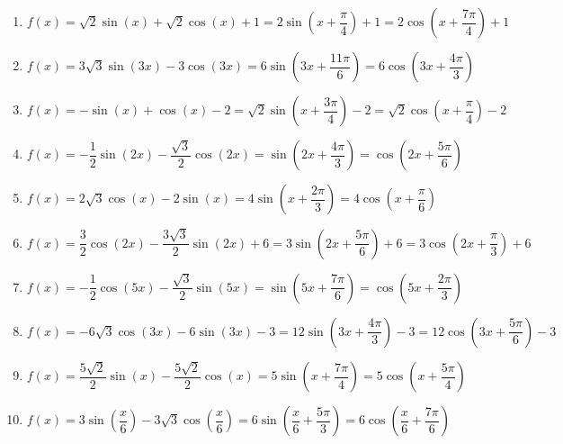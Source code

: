 \begin{enumerate}
\setcounter{enumi}{\value{HW}}
\item $f(x) = \sqrt{2}\sin(x) + \sqrt{2}\cos(x) + 1 = 2\sin\left(x + \dfrac{\pi}{4}\right) + 1 = 2\cos\left(x + \dfrac{7\pi}{4}\right) + 1$ 
\item $f(x) = 3\sqrt{3}\sin(3x) - 3\cos(3x) = 6\sin\left(3x + \dfrac{11\pi}{6}\right) = 6\cos\left(3x + \dfrac{4\pi}{3}\right)$
\item $f(x) = -\sin(x) + \cos(x) - 2 = \sqrt{2}\sin\left(x + \dfrac{3\pi}{4}\right) - 2 = \sqrt{2}\cos\left(x + \dfrac{\pi}{4}\right) - 2$
\item $f(x) = -\dfrac{1}{2}\sin(2x) - \dfrac{\sqrt{3}}{2}\cos(2x) = \sin\left(2x + \dfrac{4\pi}{3}\right) = \cos\left(2x + \dfrac{5\pi}{6}\right)$
\item $f(x) = 2\sqrt{3} \cos(x) - 2\sin(x) = 4\sin\left(x+\dfrac{2\pi}{3}  \right)  = 4\cos\left(x + \dfrac{\pi}{6}\right)$
\item  $f(x) = \dfrac{3}{2} \cos(2x) - \dfrac{3\sqrt{3}}{2} \sin(2x) + 6 =3\sin\left(2x + \dfrac{5\pi}{6}\right) + 6   = 3\cos\left(2x + \dfrac{\pi}{3}\right) + 6$
\item  $f(x) = -\dfrac{1}{2} \cos(5x) -\dfrac{\sqrt{3}}{2} \sin(5x) =  \sin\left(5x + \dfrac{7\pi}{6}\right) = \cos\left(5x + \dfrac{2\pi}{3}\right)$
\item  $f(x) = -6\sqrt{3} \cos(3x) - 6\sin(3x) - 3 = 12\sin\left(3x + \dfrac{4\pi}{3}\right) - 3 = 12\cos\left(3x + \dfrac{5\pi}{6}\right) - 3$
\item  $f(x) =  \dfrac{5\sqrt{2}}{2} \sin(x)  -\dfrac{5\sqrt{2}}{2} \cos(x) = 5\sin\left(x + \dfrac{7\pi}{4}\right)= 5\cos\left(x + \dfrac{5\pi}{4}\right)$
\item  $f(x) =3\sin\left(\dfrac{x}{6}\right) -3\sqrt{3} \cos\left(\dfrac{x}{6}\right) = 6\sin\left( \dfrac{x}{6}+\dfrac{5\pi}{3}\right)= 6\cos\left( \dfrac{x}{6}+\dfrac{7\pi}{6}\right) $

\setcounter{HW}{\value{enumi}}
\end{enumerate}

\closegraphsfile
